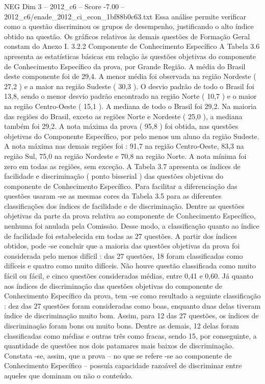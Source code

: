 \begin{textsample}{NEG Dim 3 – 2012\_c6 – Score -7.00 – 2012\_c6/enade\_2012\_ci\_econ\_1bf88b0c63.txt}
Essa análise permite verificar como a questão discriminou os grupos de desempenho, justificando o alto índice obtido na questão.
Os gráficos relativos às demais questões de Formação Geral constam do Anexo I. 3.2.2 Componente de Conhecimento Específico A Tabela 3.6 apresenta as estatísticas básicas em relação às questões objetivas do componente de Conhecimento Específico da prova, por Grande Região.
A média do Brasil deste componente foi de 29,4.
A menor média foi observada na região Nordeste ( 27,2 ) e a maior na região Sudeste ( 30,3 ).
O desvio padrão de todo o Brasil foi 13,8, sendo o menor desvio padrão encontrado na região Norte ( 10,7 ) e o maior na região Centro-Oeste ( 15,1 ).
A mediana de todo o Brasil foi 29,2.
Na maioria das regiões do Brasil, exceto as regiões Norte e Nordeste ( 25,0 ), a mediana também foi 29,2.
A nota máxima da prova ( 95,8 ) foi obtida, nas questões objetivas do Componente Específico, por pelo menos um aluno da região Sudeste.
A nota máxima nas demais regiões foi : 91,7 na região Centro-Oeste, 83,3 na região Sul, 75,0 na região Nordeste e 70,8 na região Norte.
A nota mínima foi zero em todas as regiões, sem exceção.
A Tabela 3.7 apresenta os índices de facilidade e discriminação ( ponto bisserial ) das questões objetivas do componente de Conhecimento Específico.
Para facilitar a diferenciação das questões usaram -se as mesmas cores da Tabela 3.5 para as diferentes classificações dos índices de facilidade e de discriminação.
Dentre as questões objetivas da parte da prova relativa ao componente de Conhecimento Específico, nenhuma foi anulada pela Comissão.
Desse modo, a classificação quanto ao índice de facilidade foi estabelecida em todas as 27 questões.
A partir dos índices obtidos, pode -se concluir que a maioria das questões objetivas da prova foi considerada pelo menos difícil : das 27 questões, 18 foram classificadas como difíceis e quatro como muito difíceis.
Não houve questão classificada como muito fácil ou fácil, e cinco questões consideradas médias, entre 0,41 e 0,60.
Já quanto aos índices de discriminação das questões objetivas do componente de Conhecimento Específico da prova, tem -se como resultado a seguinte classificação : dez das 27 questões foram consideradas como boas, enquanto duas delas tiveram índice de discriminação muito bom.
Assim, para 12 das 27 questões, os índices de discriminação foram bons ou muito bons.
Dentre as demais, 12 delas foram classificadas como médias e outras três como fracas, sendo 15, por conseguinte, a quantidade de questões nos dois patamares mais baixos de discriminação.
Constata -se, assim, que a prova – no que se refere -se ao componente de Conhecimento Específico – possuía capacidade razoável de discriminar entre aqueles que dominam ou não o conteúdo.

\end{textsample}
